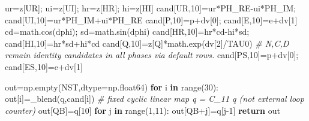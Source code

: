 \documentclass[
  a4paper,
]{ltjsarticle}
\newenvironment{Shaded}{}{}
\newcommand{\BuiltInTok}[1]{\textcolor[rgb]{0.00,0.50,0.00}{#1}}
\newcommand{\CommentTok}[1]{\textcolor[rgb]{0.38,0.63,0.69}{\textit{#1}}}
\newcommand{\ControlFlowTok}[1]{\textcolor[rgb]{0.00,0.44,0.13}{\textbf{#1}}}
\newcommand{\DecValTok}[1]{\textcolor[rgb]{0.25,0.63,0.44}{#1}}
\newcommand{\KeywordTok}[1]{\textcolor[rgb]{0.00,0.44,0.13}{\textbf{#1}}}
\newcommand{\NormalTok}[1]{#1}
\newcommand{\OperatorTok}[1]{\textcolor[rgb]{0.40,0.40,0.40}{#1}}
\begin{document}
\begin{Shaded}
\begin{Highlighting}[]
\NormalTok{    ur}\OperatorTok{=}\NormalTok{z[UR]}\OperatorTok{;}\NormalTok{ ui}\OperatorTok{=}\NormalTok{z[UI]}\OperatorTok{;}\NormalTok{ hr}\OperatorTok{=}\NormalTok{z[HR]}\OperatorTok{;}\NormalTok{ hi}\OperatorTok{=}\NormalTok{z[HI]}
\NormalTok{    cand[UR,}\DecValTok{10}\NormalTok{]}\OperatorTok{=}\NormalTok{ur}\OperatorTok{*}\NormalTok{PH\_RE}\OperatorTok{{-}}\NormalTok{ui}\OperatorTok{*}\NormalTok{PH\_IM}\OperatorTok{;}\NormalTok{ cand[UI,}\DecValTok{10}\NormalTok{]}\OperatorTok{=}\NormalTok{ur}\OperatorTok{*}\NormalTok{PH\_IM}\OperatorTok{+}\NormalTok{ui}\OperatorTok{*}\NormalTok{PH\_RE}
\NormalTok{    cand[P,}\DecValTok{10}\NormalTok{]}\OperatorTok{=}\NormalTok{p}\OperatorTok{+}\NormalTok{dv[}\DecValTok{0}\NormalTok{]}\OperatorTok{;}\NormalTok{ cand[E,}\DecValTok{10}\NormalTok{]}\OperatorTok{=}\NormalTok{e}\OperatorTok{+}\NormalTok{dv[}\DecValTok{1}\NormalTok{]}
\NormalTok{    cd}\OperatorTok{=}\NormalTok{math.cos(dphi)}\OperatorTok{;}\NormalTok{ sd}\OperatorTok{=}\NormalTok{math.sin(dphi)}
\NormalTok{    cand[HR,}\DecValTok{10}\NormalTok{]}\OperatorTok{=}\NormalTok{hr}\OperatorTok{*}\NormalTok{cd}\OperatorTok{{-}}\NormalTok{hi}\OperatorTok{*}\NormalTok{sd}\OperatorTok{;}\NormalTok{ cand[HI,}\DecValTok{10}\NormalTok{]}\OperatorTok{=}\NormalTok{hr}\OperatorTok{*}\NormalTok{sd}\OperatorTok{+}\NormalTok{hi}\OperatorTok{*}\NormalTok{cd}
\NormalTok{    cand[Q,}\DecValTok{10}\NormalTok{]}\OperatorTok{=}\NormalTok{z[Q]}\OperatorTok{*}\NormalTok{math.exp(dv[}\DecValTok{2}\NormalTok{]}\OperatorTok{/}\NormalTok{TAU0)}
    \CommentTok{\# N,C,D remain identity candidates in all phases via default rows.}
\NormalTok{    cand[PS,}\DecValTok{10}\NormalTok{]}\OperatorTok{=}\NormalTok{p}\OperatorTok{+}\NormalTok{dv[}\DecValTok{0}\NormalTok{]}\OperatorTok{;}\NormalTok{ cand[ES,}\DecValTok{10}\NormalTok{]}\OperatorTok{=}\NormalTok{e}\OperatorTok{+}\NormalTok{dv[}\DecValTok{1}\NormalTok{]}

\NormalTok{    out}\OperatorTok{=}\NormalTok{np.empty(NST,dtype}\OperatorTok{=}\NormalTok{np.float64)}
    \ControlFlowTok{for}\NormalTok{ i }\KeywordTok{in} \BuiltInTok{range}\NormalTok{(}\DecValTok{30}\NormalTok{): out[i]}\OperatorTok{=}\NormalTok{\_blend(q,cand[i])}
    \CommentTok{\# fixed cyclic linear map q\textquotesingle{} = C\_11 q (not external loop counter)}
\NormalTok{    out[QB]}\OperatorTok{=}\NormalTok{q[}\DecValTok{10}\NormalTok{]}
    \ControlFlowTok{for}\NormalTok{ j }\KeywordTok{in} \BuiltInTok{range}\NormalTok{(}\DecValTok{1}\NormalTok{,}\DecValTok{11}\NormalTok{): out[QB}\OperatorTok{+}\NormalTok{j]}\OperatorTok{=}\NormalTok{q[j}\OperatorTok{{-}}\DecValTok{1}\NormalTok{]}
    \ControlFlowTok{return}\NormalTok{ out}
\end{Highlighting}
\end{Shaded}
\end{document}
